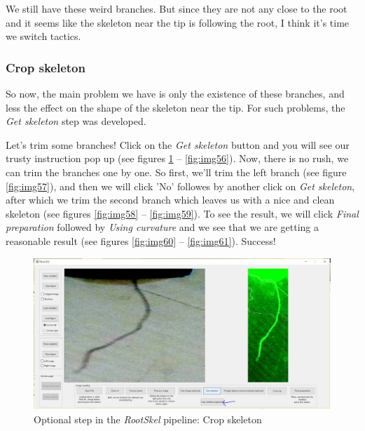 We still have these weird branches. But since they are not any close to the root and it seems like the skeleton near the tip is following the root, I think it's time we switch tactics.

\subsubsection{Crop skeleton}

So now, the main problem we have is only the existence of these branches, and less the effect on the shape of the skeleton near the tip. For such problems, the \textit{Get skeleton} step was developed. 

Let's trim some branches! Click on the \textit{Get skeleton} button and you will see our trusty instruction pop up (see figures \ref{fig:img55} -- \ref{fig:img56}).
Now, there is no rush, we can trim the branches one by one. So first, we'll trim the left branch (see figure \ref{fig:img57}), and then we will click 'No' followes by another click on \textit{Get skeleton}, after which we trim the second branch which leaves us with a nice and clean skeleton (see figures \ref{fig:img58} -- \ref{fig:img59}).
To see the result, we will click \textit{Final preparation} followed by \textit{Using curvature} and we see that we are getting a reasonable result (see figures \ref{fig:img60} -- \ref{fig:img61}). Success!


\begin{figure}[H]
	\centering
	\includegraphics[width=\textwidth]{../Figures/manual/optionalD1.jpg}
	\caption{Optional step in the \textit{RootSkel} pipeline: Crop skeleton}
	\label{fig:img55}
\end{figure}

